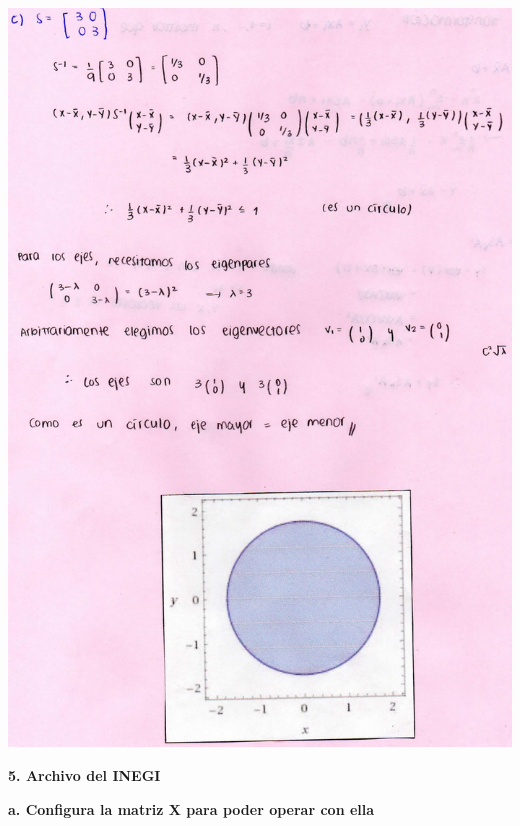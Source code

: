 \documentclass[
]{article}
\begin{document}
\includegraphics{4c.jpg}

\textbf{5. Archivo del INEGI}

\textbf{a. Configura la matriz X para poder operar con ella}
\end{document}
